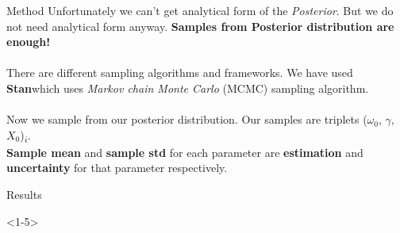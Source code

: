 \begin{frame}{Method}
Unfortunately we can't get analytical form of the \textit{Posterior}. But we do not need analytical form anyway. \textbf{Samples from Posterior distribution are enough!}
\\~\\
\pause
There are different sampling algorithms and frameworks. We have used \textbf{Stan}\footnotemark which uses \textit{Markov chain Monte Carlo} (MCMC) sampling algorithm.
\\~\\
\pause
Now we sample from our posterior distribution. Our samples are triplets ($\omega_0$, $\gamma$,$X_0$)\textsubscript{$i$}. \\
\textbf{Sample mean} and \textbf{sample std} for each parameter are \textbf{estimation} and \textbf{uncertainty} for that parameter respectively.

 {\let\thefootnote\relax\footnotetext{~}}

\end{frame}

\begin{frame}{Results}
\begin{onlyenv}<1-5>
\begin{figure}[h]
\end{figure}
\end{onlyenv}
\end{frame}


